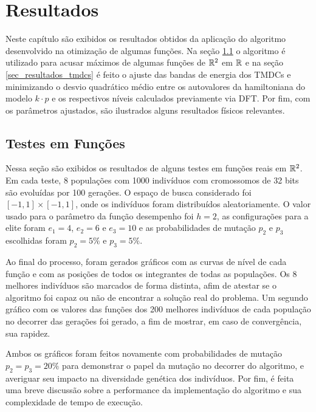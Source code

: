 \chapter{Resultados}
\label{cap_resultados}

Neste capítulo são exibidos os resultados obtidos da aplicação do algoritmo
desenvolvido na otimização de algumas funções. Na seção \ref{sec_test_functions}
o algoritmo é utilizado para acusar máximos de algumas funções de $\mathbb{R}^2$ em $\mathbb{R}$
e na seção \ref{sec_resultados_tmdcs} é feito o ajuste das bandas de energia
dos TMDCs  e  minimizando o desvio quadrático médio entre
os autovalores da hamiltoniana do modelo $ k \cdot p $ e os respectivos níveis
calculados previamente via DFT. Por fim, com os parâmetros ajustados, são ilustrados
alguns resultados físicos relevantes.

\section{Testes em Funções}
\label{sec_test_functions}

Nessa seção são exibidos os resultados de alguns testes em funções reais em $\mathbb{R}^2$. Em cada teste, 
8 populações com 1000 indivíduos com cromossomos de 32 bits são evoluídas por 100 gerações. O espaço de busca
considerado foi $ [-1,1] \times [-1, 1] $, onde os indivíduos foram distribuídos aleatoriamente. 
O valor usado para o parâmetro da função desempenho foi $h = 2$,
as configurações para a elite foram $e_1 = 4$, $e_2 = 6$ e $e_3 = 10$ e as probabilidades de mutação $p_2$ e $p_3$ escolhidas
foram $p_2 = 5\%$ e $p_3 = 5\%$.

Ao final do processo,
foram gerados gráficos com as curvas de nível de cada função e com as posições de todos os
integrantes de todas as populações. Os 8 melhores indivíduos são marcados de forma distinta,
afim de atestar se o algoritmo foi capaz ou não de encontrar a solução real do problema.
Um segundo gráfico com os valores das funções dos 200 melhores indivíduos de cada população
no decorrer das gerações foi gerado, a fim de mostrar, em caso de convergência, sua rapidez.

Ambos os gráficos foram feitos novamente com probabilidades de mutação $p_2 = p_3 = 20\%$
para demonstrar o papel da mutação no decorrer do algoritmo, e averiguar seu impacto na diversidade genética
dos indivíduos.
Por fim, é feita uma breve discussão sobre a performance da implementação do algoritmo e sua
complexidade de tempo de execução.

